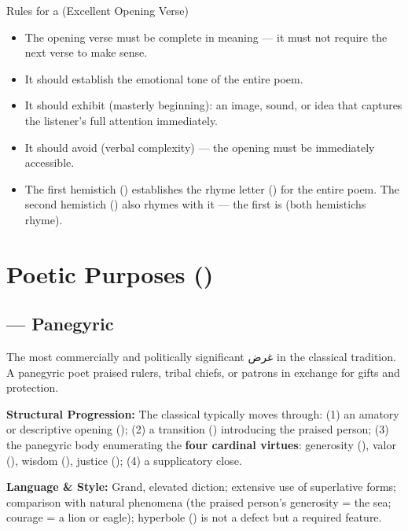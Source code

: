 \begin{rulebox}{Rules for a  (Excellent Opening Verse)}
\begin{itemize}
  \item The opening verse must be complete in meaning — it must not require the next verse to make sense.
  \item It should establish the emotional tone of the entire poem.
  \item It should exhibit  (masterly beginning): an image, sound, or idea that captures the listener's full attention immediately.
  \item It should avoid  (verbal complexity) — the opening must be immediately accessible.
  \item The first hemistich () establishes the rhyme letter () for the entire poem. The second hemistich () also rhymes with it — the first  is  (both hemistichs rhyme).
\end{itemize}
\end{rulebox}

\section{Poetic Purposes ()}
\label{sec:aghard}

\subsection{ — Panegyric}
\label{subsec:madih}

The most commercially and politically significant غرض in the classical tradition. A panegyric poet praised rulers, tribal chiefs, or patrons in exchange for gifts and protection.

\textbf{Structural Progression:} The classical  typically moves through: (1) an amatory or descriptive opening (); (2) a transition () introducing the praised person; (3) the panegyric body enumerating the \textbf{four cardinal virtues}: generosity (), valor (), wisdom (), justice (); (4) a supplicatory close.

\textbf{Language \& Style:} Grand, elevated diction; extensive use of superlative forms; comparison with natural phenomena (the praised person's generosity = the sea; courage = a lion or eagle); hyperbole () is not a defect but a required feature.

